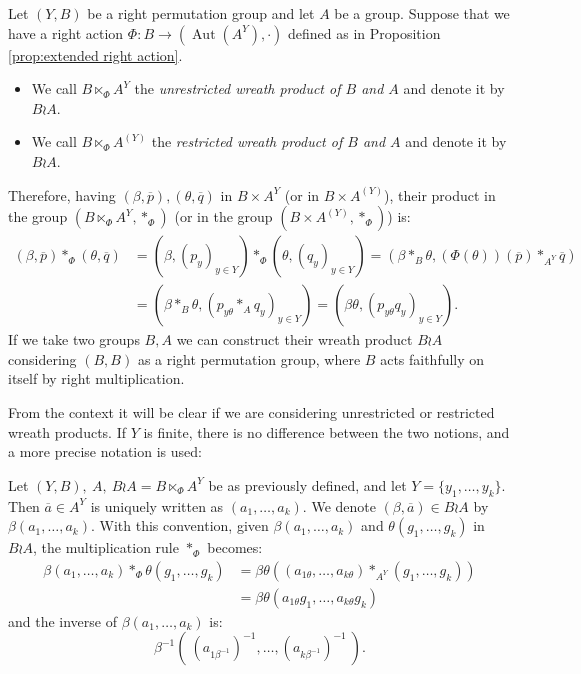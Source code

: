 \documentclass[mat1]{fmfdeloTS2.0}
\newcommand{\obs}{}				%
\DeclareMathOperator{\aut}{\mathrm{Aut}}		%
\begin{document}
\begin{definition}
Let $(Y,B)$ be a right permutation group and let $A$ be a group. Suppose that we have a right action $\Phi:B\longrightarrow (\aut(A^Y),\cdot)$ defined as in Proposition \autoref{prop:extended right action}.
\begin{itemize}
\item We call $B\ltimes_\Phi A^{Y}$ the \emph{unrestricted wreath product of $B$ and $A$} and denote it by $B\wr A$.
\item We call $B\ltimes_\Phi A^{(Y)}$ the \emph{restricted wreath product of $B$ and $A$} and denote it by $B\wr A$.
\end{itemize}
Therefore, having $(\beta, \overline{p}),(\theta,\overline{q})$ in $B\times A^{Y}$ (or in $B\times A^{(Y)}$), their product in the group $(B\ltimes_\Phi A^{Y},*_\Phi)$ (or in the group $(B\times A^{(Y)},*_\Phi)$) is:
\begin{align*} 
(\beta, \overline{p})*_\Phi(\theta,\overline{q})&=(\beta, (p_y)_{y\in Y})*_\Phi(\theta,(q_y)_{y\in Y})=(\beta*_B \theta,(\Phi(\theta))(\overline{p})*_{A^Y}\overline{q})\\
&=(\beta*_B \theta,(p_{y\theta}*_A q_{y})_{y\in Y})=(\beta \theta,(p_{y\theta}q_{y})_{y\in Y}).
\end{align*}
If we take two groups $B,A$ we can construct their wreath product $B\wr A$ considering $(B,B)$ as a right permutation group, where $B$ acts faithfully on itself by right multiplication.
\end{definition}

From the context it will be clear if we are considering \obs{unrestricted} or \obs{restricted} wreath products. If $Y$ is finite, there is no difference between the two notions, and a more precise notation is used:

\begin{remark}\label{wreath notation}
Let $(Y,B),\:A,\: B \wr A=B\ltimes_\Phi A^Y$ be as previously defined, and let $Y=\{y_1, \ldots ,y_k\}$. Then $\overline{a}\in A^Y$ is uniquely written as $(a_1,\ldots , a_k)$. We denote $(\beta, \overline{a})\in B \wr A$ by $\beta(a_1,\ldots,a_k)$. With this convention, given $\beta(a_1,\ldots,a_k)$ and $\theta(g_1,\ldots,g_k)$ in $B \wr A$, the multiplication rule $*_\Phi$ becomes:
\begin{align*} \beta(a_1,\ldots,a_k)*_\Phi\theta(g_1,\ldots,g_k)&=\beta\theta((a_{1\theta},\ldots,a_{ k\theta})*_{A^Y}(g_1,\ldots,g_k))\\
&=\beta\theta(a_{ 1\theta} g_1,\ldots,a_{k\theta} g_k)
\end{align*}
and the inverse of $\beta(a_1,\ldots,a_k)$ is:
$$\beta^{-1}(\:(a_{1\beta^{-1}})^{-1},\ldots,(a_{k\beta^{-1}})^{-1}\:).$$
\end{remark}
\end{document}
